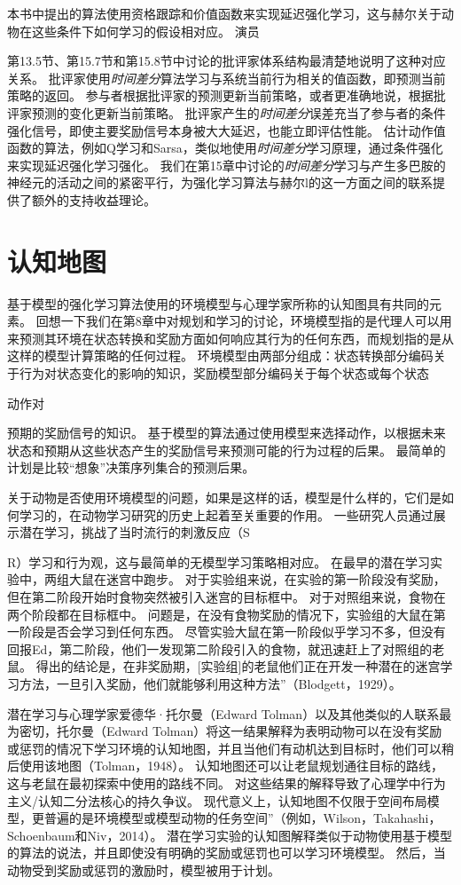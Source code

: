{{本书中提出的算法使用资格跟踪和价值函数来实现延迟强化学习，这与赫尔关于动物在这些条件下如何学习的假设相对应。
演员{第13.5节、第15.7节和第15.8节中讨论的批评家体系结构最清楚地说明了这种对应关系。
批评家使用\textit{时间差分}算法学习与系统当前行为相关的值函数，即预测当前策略的返回。
参与者根据批评家的预测更新当前策略，或者更准确地说，根据批评家预测的变化更新当前策略。
批评家产生的\textit{时间差分}误差充当了参与者的条件强化信号，即使主要奖励信号本身被大大延迟，也能立即评估性能。
估计动作值函数的算法，例如Q学习和Sarsa，类似地使用\textit{时间差分}学习原理，通过条件强化来实现延迟强化学习强化。
我们在第15章中讨论的\textit{时间差分}学习与产生多巴胺的神经元的活动之间的紧密平行，为强化学习算法与赫尔l的这一方面之间的联系提供了额外的支持收益理论。


\section{认知地图} \label{sec:cognitive_maps}

基于模型的强化学习算法使用的环境模型与心理学家所称的认知图具有共同的元素。
回想一下我们在第8章中对规划和学习的讨论，环境模型指的是代理人可以用来预测其环境在状态转换和奖励方面如何响应其行为的任何东西，而规划指的是从这样的模型计算策略的任何过程。
环境模型由两部分组成：状态转换部分编码关于行为对状态变化的影响的知识，奖励模型部分编码关于每个状态或每个状态{动作对{预期的奖励信号的知识。
基于模型的算法通过使用模型来选择动作，以根据未来状态和预期从这些状态产生的奖励信号来预测可能的行为过程的后果。
最简单的计划是比较“想象”决策序列集合的预测后果。


关于动物是否使用环境模型的问题，如果是这样的话，模型是什么样的，它们是如何学习的，在动物学习研究的历史上起着至关重要的作用。
一些研究人员通过展示潜在学习，挑战了当时流行的刺激反应（S{R）学习和行为观，这与最简单的无模型学习策略相对应。
在最早的潜在学习实验中，两组大鼠在迷宫中跑步。
对于实验组来说，在实验的第一阶段没有奖励，但在第二阶段开始时食物突然被引入迷宫的目标框中。
对于对照组来说，食物在两个阶段都在目标框中。
问题是，在没有食物奖励的情况下，实验组的大鼠在第一阶段是否会学习到任何东西。
尽管实验大鼠在第一阶段似乎学习不多，但没有回报Ed，第二阶段，他们一发现第二阶段引入的食物，就迅速赶上了对照组的老鼠。
得出的结论是，在非奖励期，[实验组]的老鼠他们正在开发一种潜在的迷宫学习方法，一旦引入奖励，他们就能够利用这种方法”（Blodgett，1929）。



潜在学习与心理学家爱德华·托尔曼（Edward Tolman）以及其他类似的人联系最为密切，托尔曼（Edward Tolman）将这一结果解释为表明动物可以在没有奖励或惩罚的情况下学习环境的认知地图，并且当他们有动机达到目标时，他们可以稍后使用该地图（Tolman，1948）。
认知地图还可以让老鼠规划通往目标的路线，这与老鼠在最初探索中使用的路线不同。
对这些结果的解释导致了心理学中行为主义/认知二分法核心的持久争议。
现代意义上，认知地图不仅限于空间布局模型，更普遍的是环境模型或模型动物的任务空间”（例如，Wilson，Takahashi，Schoenbaum和Niv，2014）。
潜在学习实验的认知图解释类似于动物使用基于模型的算法的说法，并且即使没有明确的奖励或惩罚也可以学习环境模型。
然后，当动物受到奖励或惩罚的激励时，模型被用于计划。


}}}}}}
